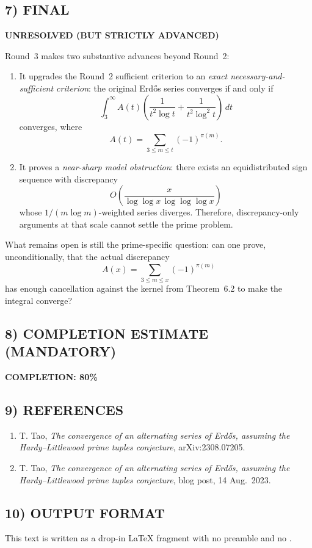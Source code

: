 \subsection*{7) FINAL}

\textbf{UNRESOLVED (BUT STRICTLY ADVANCED)}

Round~3 makes two substantive advances beyond Round~2:

\begin{enumerate}
\item It upgrades the Round~2 sufficient criterion to an \emph{exact necessary-and-sufficient criterion}:
the original Erd\H{o}s series converges if and only if
\[
\int_3^\infty
A(t)\left(\frac{1}{t^2\log t}+\frac{1}{t^2\log^2 t}\right)\,dt
\]
converges, where
\[
A(t)=\sum_{3\le m\le t} (-1)^{\pi(m)}.
\]

\item It proves a \emph{near-sharp model obstruction}:
there exists an equidistributed sign sequence with discrepancy
\[
O\!\left(\frac{x}{\log\log x\,\log\log\log x}\right)
\]
whose \(1/(m\log m)\)-weighted series diverges.
Therefore, discrepancy-only arguments at that scale cannot settle the prime problem.
\end{enumerate}

What remains open is still the prime-specific question:
can one prove, unconditionally, that the actual discrepancy
\[
A(x)=\sum_{3\le m\le x} (-1)^{\pi(m)}
\]
has enough cancellation against the kernel from Theorem~6.2 to make the integral converge?

\subsection*{8) COMPLETION ESTIMATE (MANDATORY)}

\textbf{COMPLETION: 80\%}

\subsection*{9) REFERENCES}

\begin{enumerate}
\item T. Tao,
\emph{The convergence of an alternating series of Erd\H{o}s, assuming the Hardy--Littlewood prime tuples conjecture},
arXiv:2308.07205.

\item T. Tao,
\emph{The convergence of an alternating series of Erd\H{o}s, assuming the Hardy--Littlewood prime tuples conjecture},
blog post, 14 Aug.\ 2023.
\end{enumerate}

\subsection*{10) OUTPUT FORMAT}

This text is written as a drop-in \LaTeX{} fragment with no preamble and no \verb||.
